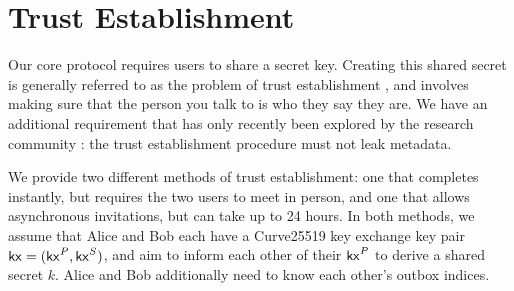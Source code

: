 \section{Trust Establishment}
\label{sec:trustestablishment}

Our core protocol requires users to share a secret key. Creating this shared secret is generally referred to as the problem of trust establishment \cite{unger2015sok}, and involves making sure that the person you talk to is who they say they are. We have an additional requirement that has only recently been explored by the research community \cite{liutromer2021}: the trust establishment procedure must not leak metadata.


We provide two different methods of trust establishment: one that completes instantly, but requires the two users to meet in person, and one that allows asynchronous invitations, but can take up to 24 hours. In both methods, we assume that Alice and Bob each have a Curve25519 key exchange key pair $\mathsf{kx} = (\mathsf{kx}^P, \mathsf{kx}^S)$, and aim to inform each other of their $\mathsf{kx}^P$ to derive a shared secret $k$. Alice and Bob additionally need to know each other's outbox indices.









